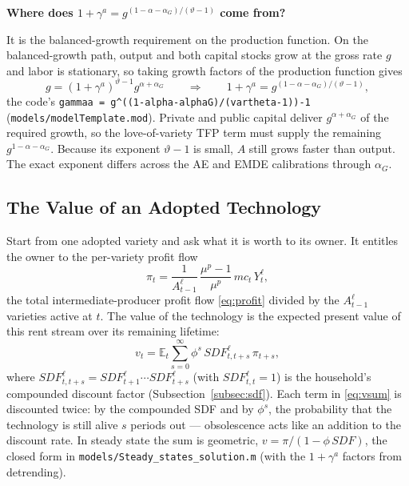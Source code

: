 \documentclass[11pt]{article}
\newcommand{\intuition}[2]{%
  \par\medskip\noindent\hspace*{\fill}%
  \colorbox{intuitionblue}{\parbox{0.94\linewidth}{\textbf{#1}\par\smallskip #2}}%
  \hspace*{\fill}\par\medskip}
\begin{document}
\intuition{Where does $1+\gamma^{a} = g^{(1-\alpha-\alpha_G)/(\vartheta-1)}$ come from?}{%
It is the balanced-growth requirement on the production function. On the
balanced-growth path, output and both capital stocks grow at the gross rate $g$
and labor is stationary, so taking growth factors of the production function gives
\[
    g = \left(1+\gamma^{a}\right)^{\vartheta-1} g^{\alpha+\alpha_G}
    \qquad\Longrightarrow\qquad
    1+\gamma^{a} = g^{(1-\alpha-\alpha_G)/(\vartheta-1)},
\]
the code's \texttt{gammaa = g\^{}((1-alpha-alphaG)/(vartheta-1))-1}
(\texttt{models/modelTemplate.mod}). Private and public capital deliver
$g^{\alpha+\alpha_G}$ of the required growth, so the love-of-variety TFP term
must supply the remaining $g^{1-\alpha-\alpha_G}$. Because its exponent
$\vartheta-1$ is small, $A$ still grows faster than output. The exact exponent
differs across the AE and EMDE calibrations through $\alpha_G$.}

\subsection{The Value of an Adopted Technology}

Start from one adopted variety and ask what it is worth to its owner. It
entitles the owner to the per-variety profit flow
\begin{equation}\label{eq:pidef}
    \pi_t = \frac{1}{A^{\ell}_{t-1}}\,\frac{\mu^{p}-1}{\mu^{p}}\,mc_t\,Y^{\ell}_t,
\end{equation}
the total intermediate-producer profit flow \eqref{eq:profit} divided by the
$A^{\ell}_{t-1}$ varieties active at $t$. The value of the technology is the
expected present value of this rent stream over its remaining lifetime:
\begin{equation}\label{eq:vsum}
    v_t = \mathbb{E}_t \sum_{s=0}^{\infty} \phi^{s}\,
    \mathit{SDF}^{\ell}_{t,t+s}\,\pi_{t+s},
\end{equation}
where $\mathit{SDF}^{\ell}_{t,t+s} = \mathit{SDF}^{\ell}_{t+1}\cdots
\mathit{SDF}^{\ell}_{t+s}$ (with $\mathit{SDF}^{\ell}_{t,t}=1$) is the
household's compounded discount factor (Subsection~\ref{subsec:sdf}). Each term
in \eqref{eq:vsum} is discounted twice: by the compounded SDF and by
$\phi^{s}$, the probability that the technology is still alive $s$ periods out
--- obsolescence acts like an addition to the discount rate. In steady state
the sum is geometric, $v = \pi/(1-\phi\,\mathit{SDF})$, the closed form in
\texttt{models/Steady\_states\_solution.m} (with the $1+\gamma^{a}$ factors
from detrending).
\end{document}
